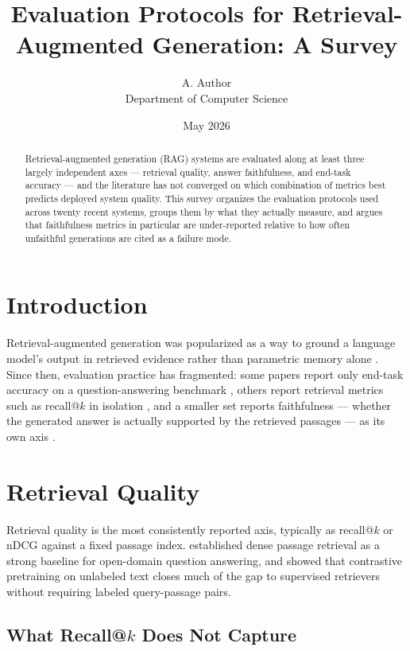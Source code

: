 \documentclass[11pt]{article}
\title{Evaluation Protocols for Retrieval-Augmented Generation: A Survey}
\author{A. Author \\ Department of Computer Science}
\date{May 2026}
\begin{document}
\maketitle

\begin{abstract}
Retrieval-augmented generation (RAG) systems are evaluated along at
least three largely independent axes --- retrieval quality, answer
faithfulness, and end-task accuracy --- and the literature has not
converged on which combination of metrics best predicts deployed
system quality. This survey organizes the evaluation protocols used
across twenty recent systems, groups them by what they actually
measure, and argues that faithfulness metrics in particular are
under-reported relative to how often unfaithful generations are cited
as a failure mode.
\end{abstract}

\section{Introduction}
\label{sec:intro}

Retrieval-augmented generation was popularized as a way to ground a
language model's output in retrieved evidence rather than parametric
memory alone \autocite{lewis2020rag}. Since then, evaluation practice
has fragmented: some papers report only end-task accuracy on a
question-answering benchmark \autocite{karpukhin2020dpr}, others report
retrieval metrics such as recall@$k$ in isolation
\autocite{izacard2021contriever}, and a smaller set reports
faithfulness --- whether the generated answer is actually supported by
the retrieved passages --- as its own axis \autocite{es2023ragas,niu2024ragtruth}.

\section{Retrieval Quality}
\label{sec:retrieval}

Retrieval quality is the most consistently reported axis, typically as
recall@$k$ or nDCG against a fixed passage index. \textcite{karpukhin2020dpr}
established dense passage retrieval as a strong baseline for open-domain
question answering, and \textcite{izacard2021contriever} showed that
contrastive pretraining on unlabeled text closes much of the gap to
supervised retrievers without requiring labeled query-passage pairs.

\subsection{What Recall@$k$ Does Not Capture}
\label{sec:recall-limits}
\end{document}
